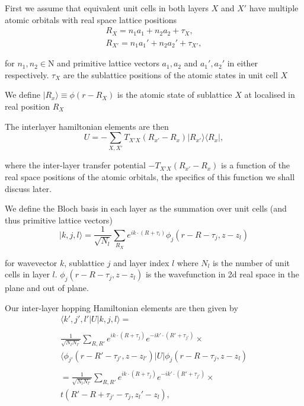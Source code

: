 \documentclass[12pt]{report} %
\begin{document}
  First we assume that equivalent unit cells in both layers $X$ and $X'$ have multiple atomic orbitals with real space lattice positions
  \begin{equation}
    \begin{gathered}
    R_X = n_1 a_1 + n_2 a_2 + \tau_X,\\
    R_{X'} = n_1 a_1' + n_2 a_2' + \tau_{X'},
    \end{gathered}
    \label{inter-layer_real_sublattice_positions}
  \end{equation}

  for $n_1, n_2 \in \mathrm{N}$ and primitive lattice vectors $a_1, a_2$ and $a_1', a_2'$ in either respectively. $\tau_X$ are the sublattice positions of the atomic states in unit cell $X$

  We define $| R_x \rangle \equiv \phi(r - R_X)$ is the atomic state of sublattice $X$ at localised in real position $R_X$

  The interlayer hamiltonian elements are then
  \begin{equation}
    U = -\sum_{X, X'} T_{X'X}(R_{x'} - R_x) |R_{x'}\rangle \langle R_x|,
    \label{inter-layer_hamiltonian_elements}
  \end{equation}

  where the inter-layer transfer potential $-T_{X'X}(R_{x'} - R_x)$ is a function of the real space positions of the atomic orbitals, the specifics of this function we shall discuss later.

  We define the Bloch basis in each layer as the summation over unit cells (and thus primitive lattice vectors)
  \begin{equation}
    | k,j,l \rangle = \frac{1}{\sqrt{N_l}}\sum_{R_X}e^{ik\cdot(R+\tau_i)}\phi_j(r-R-\tau_j, z-z_l)
    \label{inter-layer_real_bloch_basis}
  \end{equation}

  for wavevector $k$, sublattice $j$ and layer index $l$ where $N_l$ is the number of unit cells in layer $l$. $\phi_j (r - R - \tau_j, z-z_l)$ is the wavefunction in 2d real space in the plane and out of plane.

  Our inter-layer hopping Hamiltonian elements are then given by
  \begin{multline}
    \langle k',j',l' | U | k, j, l \rangle = \\
    ~\\
    \frac{1}{\sqrt{N_l N_{l'}}} \sum_{R, R'} e^{ik \cdot (R+\tau_j)} e^{-ik' \cdot (R' + \tau_{j'})} \times \\
    \langle \phi_{j'}(r - R' - \tau_{j'}, z - z_{l'}) | U | \phi_j (r - R - \tau_j, z - z_l)\\
    ~\\
     =\frac{1}{\sqrt{N_l N_{l'}}} \sum_{R, R'} e^{ik \cdot (R+\tau_j)} e^{-ik' \cdot (R' + \tau_{j'})} \times \\
     t(R'-R +\tau_{j'} - \tau_j, z_l' - z_l),
    \label{}
  \end{multline}
\end{document}
